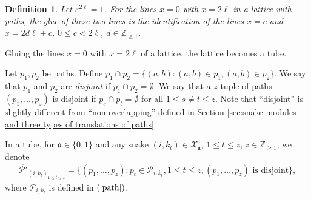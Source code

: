 \documentclass[12pt, reqno]{amsart}
\newtheorem{definition}[theorem]{Definition}
\numberwithin{equation}{section}
\begin{document}
{\begin{definition}\label{D:glue}
Let $\varepsilon^{2 \ell}=1$. For the lines $x=0$ with $x=2 \ell$ in a lattice with paths, the glue of these two lines is the identification of the lines $x=c$ and $x=2d \ell+c$, $0\leq c<2 \ell$, $d\in \mathbb{Z}_{\geq 1}$.
\end{definition}

Gluing the lines $x=0$ with $x=2 \ell$ of a lattice, the lattice becomes a tube.

Let $p_1, p_2$ be paths. Define $p_1\cap p_2= \{(a, b):(a, b)\in p_1, (a, b) \in p_2\}$.
We say that $p_1$ and $p_2$ are \textit{disjoint} if $p_1\cap p_2=\emptyset$. We say that a $z$-tuple of paths $(p_{1},\ldots,p_{z})$ is disjoint if $p_{s}\cap p_{t}=\emptyset$ for all $1\leq s\neq t\leq z$. Note that ``disjoint'' is slightly different from ``non-overlapping'' defined in Section \ref{sec:snake modules and three types of translations of paths}.

In a tube, for $\mathfrak{a} \in \{0,1\}$ and any snake $(i,k_t)\in \mathcal{X}_{\mathfrak{a}}$, $1\leq t\leq z$, $z\in \mathbb{Z}_{\geq1}$, we denote
\begin{align}\label{def: disjoint path in a tube}
\overline{\mathscr{P'}}_{{{(i,k_t)}_{1\leq t\leq z}}}=\{(p_{1},\ldots,p_{z}): p_{t}\in \mathscr{P}_{i,k_t}, 1\leq t\leq z, (p_{1},\ldots,p_{z})\text { is disjoint} \},
\end{align}
where $\mathscr{P}_{i,k_t}$ is defined in $(\ref{path})$.


}
\end{document}

